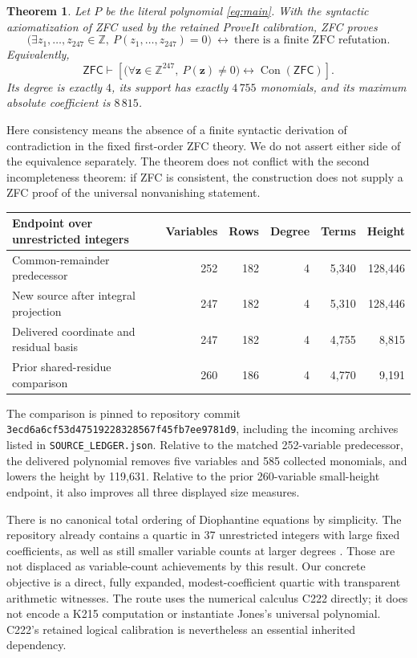 \documentclass[11pt,letterpaper]{article}
\newtheorem{theorem}{Theorem}
\newcommand{\ZZ}{\mathbb Z}
\newcommand{\Con}{\operatorname{Con}}
\newcommand{\ZFC}{\mathsf{ZFC}}
\newcommand{\file}[1]{\texttt{\nolinkurl{#1}}}
\begin{document}
\begin{theorem}\label{thm:main}
Let $P$ be the literal polynomial \eqref{eq:main}. With the syntactic
axiomatization of ZFC used by the retained ProveIt calibration, ZFC proves
\[
 \bigl(\exists z_1,\ldots,z_{247}\in\ZZ,\ P(z_1,\ldots,z_{247})=0\bigr)
 \ \longleftrightarrow\
 \text{there is a finite ZFC refutation}.
\]
Equivalently,
\[
 \ZFC\vdash
 \left[
 \bigl(\forall \mathbf z\in\ZZ^{247},\ P(\mathbf z)\ne0\bigr)
 \longleftrightarrow \Con(\ZFC)
 \right].
\]
Its degree is exactly $4$, its support has exactly $4\,755$ monomials,
and its maximum absolute coefficient is $8\,815$.
\end{theorem}

Here consistency means the absence of a finite syntactic derivation of
contradiction in the fixed first-order ZFC theory. We do not assert
either side of the equivalence separately. The theorem does not
conflict with the second incompleteness theorem: if ZFC is consistent,
the construction does not supply a ZFC proof of the universal
nonvanishing statement.

\begin{center}
\small
\begin{tabular}{@{}lrrrrr@{}}
\toprule
Endpoint over unrestricted integers & Variables & Rows & Degree & Terms & Height\\
\midrule
Common-remainder predecessor &252&182&4&5,340&128,446\\
New source after integral projection &247&182&4&5,310&128,446\\
Delivered coordinate and residual basis &247&182&4&4,755&8,815\\
Prior shared-residue comparison &260&186&4&4,770&9,191\\
\bottomrule
\end{tabular}
\end{center}

The comparison is pinned to repository commit
\file{3ecd6a6cf53d47519228328567f45fb7ee9781d9}, including the incoming
archives listed in \file{SOURCE_LEDGER.json}. Relative to the matched
252-variable predecessor, the delivered polynomial removes five
variables and 585 collected monomials, and lowers the height by
119,631. Relative to the prior 260-variable small-height endpoint, it
also improves all three displayed size measures.

There is no canonical total ordering of Diophantine equations by
simplicity. The repository already contains a quartic in 37 unrestricted
integers with large fixed coefficients, as well as still smaller
variable counts at larger degrees \cite{repo}. Those are not displaced
as variable-count achievements by this result. Our concrete objective
is a direct, fully expanded, modest-coefficient quartic with transparent
arithmetic witnesses. The route uses the numerical calculus C222
directly; it does not encode a K215 computation or instantiate Jones's
universal polynomial. C222's retained logical calibration is nevertheless
an essential inherited dependency.
\end{document}
